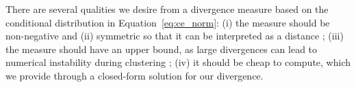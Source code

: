\documentclass[12pt,compact]{article}
\begin{document}
There are several qualities we desire from a divergence measure based on the conditional distribution in Equation~\eqref{eq:ce_norm}:
(i) the measure should be non-negative and (ii) symmetric so that it can be interpreted as a distance \citep{Vijendra2015};
(iii) the measure should have an upper bound, as large divergences can lead to numerical instability during clustering \citep{Thiagarajan2025}; %
(iv) it should be cheap to compute, which we provide through a closed-form solution for our divergence. 
\end{document}
